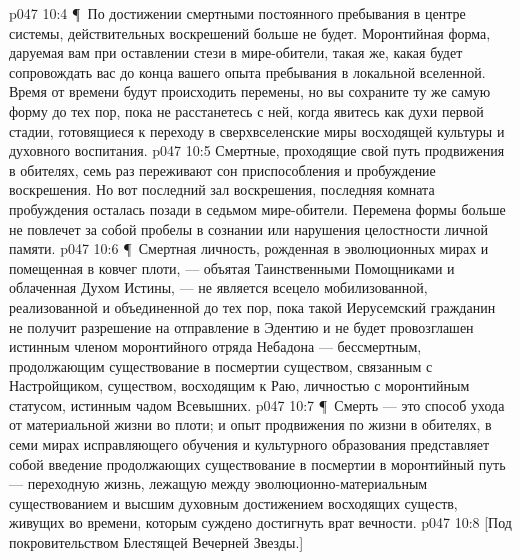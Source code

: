 \vs p047 10:4 \P\ По достижении смертными постоянного пребывания в центре системы, действительных воскрешений больше не будет. Моронтийная форма, даруемая вам при оставлении стези в мире\hyp{}обители, такая же, какая будет сопровождать вас до конца вашего опыта пребывания в локальной вселенной. Время от времени будут происходить перемены, но вы сохраните ту же самую форму до тех пор, пока не расстанетесь с ней, когда явитесь как духи первой стадии, готовящиеся к переходу в сверхвселенские миры восходящей культуры и духовного воспитания.
\vs p047 10:5 Смертные, проходящие свой путь продвижения в обителях, семь раз переживают сон приспособления и пробуждение воскрешения. Но вот последний зал воскрешения, последняя комната пробуждения осталась позади в седьмом мире\hyp{}обители. Перемена формы больше не повлечет за собой пробелы в сознании или нарушения целостности личной памяти.
\vs p047 10:6 \P\ Смертная личность, рожденная в эволюционных мирах и помещенная в ковчег плоти, --- объятая Таинственными Помощниками и облаченная Духом Истины, --- не является всецело мобилизованной, реализованной и объединенной до тех пор, пока такой Иерусемский гражданин не получит разрешение на отправление в Эдентию и не будет провозглашен истинным членом моронтийного отряда Небадона --- бессмертным, продолжающим существование в посмертии существом, связанным с Настройщиком, существом, восходящим к Раю, личностью с моронтийным статусом, истинным чадом Всевышних.
\vs p047 10:7 \P\ Смерть --- это способ ухода от материальной жизни во плоти; и опыт продвижения по жизни в обителях, в семи мирах исправляющего обучения и культурного образования представляет собой введение продолжающих существование в посмертии в моронтийный путь --- переходную жизнь, лежащую между эволюционно\hyp{}материальным существованием и высшим духовным достижением восходящих существ, живущих во времени, которым суждено достигнуть врат вечности.
\vs p047 10:8 [Под покровительством Блестящей Вечерней Звезды.]
